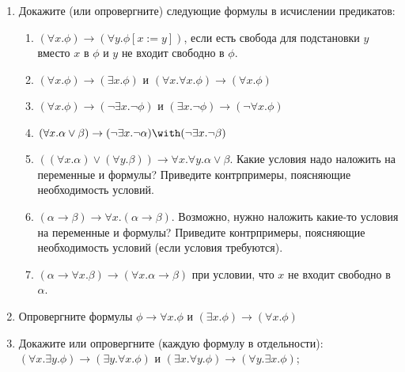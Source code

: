 \documentclass[10pt,a4paper,oneside]{article}
\begin{document}
\begin{enumerate}
\item Докажите (или опровергните) следующие формулы в исчислении предикатов:
\begin{enumerate}
\item $(\forall x.\phi)\rightarrow (\forall y.\phi[x := y])$, если есть свобода для подстановки $y$ вместо $x$ в $\phi$ и $y$ не входит свободно в $\phi$.
\item $(\forall x.\phi)\rightarrow (\exists x.\phi)$ и $(\forall x.\forall x.\phi) \rightarrow (\forall x.\phi)$
\item $(\forall x.\phi) \rightarrow (\neg \exists x.\neg \phi)$ и $(\exists x.\neg\phi) \rightarrow (\neg \forall x.\phi)$
\item $(\forall x.\alpha\vee\beta) \rightarrow (\neg \exists x.\neg \alpha) \with (\neg \exists x.\neg\beta)$
\item $((\forall x.\alpha) \vee (\forall y.\beta)) \rightarrow \forall x.\forall y.\alpha\vee\beta$. Какие условия
надо наложить на переменные и формулы? Приведите контрпримеры, поясняющие необходимость условий.
\item $(\alpha\rightarrow\beta) \rightarrow \forall x.(\alpha\rightarrow\beta)$. Возможно, нужно наложить
какие-то условия на переменные и формулы? Приведите контрпримеры, поясняющие необходимость условий (если 
условия требуются).
\item $(\alpha \rightarrow \forall x.\beta) \rightarrow (\forall x.\alpha\rightarrow\beta)$ при условии, что $x$ не входит свободно в $\alpha$.
\end{enumerate}

\item Опровергните формулы $\phi\rightarrow\forall x.\phi$ и $(\exists x.\phi)\rightarrow (\forall x.\phi)$

\item Докажите или опровергните (каждую формулу в отдельности): $(\forall x.\exists y.\phi) \rightarrow (\exists y.\forall x.\phi)$ и
$(\exists x.\forall y.\phi) \rightarrow (\forall y.\exists x.\phi)$;

\end{enumerate}
\end{document}
